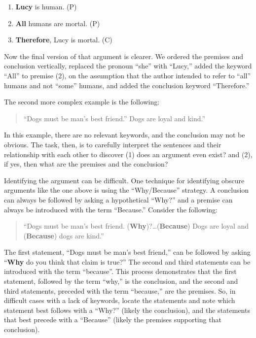 \documentclass[
]{book}
\providecommand{\tightlist}{%
  \setlength{\itemsep}{0pt}\setlength{\parskip}{0pt}}
\begin{document}
\begin{enumerate}
\def\labelenumi{\arabic{enumi}.}
\tightlist
\item
  \textbf{Lucy} is human. (P)\\
\item
  \textbf{All} humans are mortal. (P)\\
\item
  \textbf{Therefore}, Lucy is mortal. (C)
\end{enumerate}

Now the final version of that argument is clearer. We ordered the premises and conclusion vertically, replaced the pronoun ``she'' with ``Lucy,'' added the keyword ``All'' to premise (2), on the assumption that the author intended to refer to ``all'' humans and not ``some'' humans, and added the conclusion keyword ``Therefore.''

The second more complex example is the following:

\begin{quote}
``Dogs must be man's best friend.'' Dogs are loyal and kind.''
\end{quote}

In this example, there are no relevant keywords, and the conclusion may not be obvious. The task, then, is to carefully interpret the sentences and their relationship with each other to discover (1) does an argument even exist? and (2), if yes, then what are the premises and the conclusion?

Identifying the argument can be difficult. One technique for identifying obscure arguments like the one above is using the ``Why/Because'' strategy. A conclusion can always be followed by asking a hypothetical ``Why?'' and a premise can always be introduced with the term ``Because.'' Consider the following:

\begin{quote}
``Dogs must be man's best friend. (\textbf{Why})?\ldots(\textbf{Because}) Dogs are loyal and (\textbf{Because}) dogs are kind.''
\end{quote}

The first statement, ``Dogs must be man's best friend,'' can be followed by asking ``\textbf{Why} do you think that claim is true?'' The second and third statements can be introduced with the term ``because''. This process demonstrates that the first statement, followed by the term ``why,'' is the conclusion, and the second and third statements, preceded with the term ``because,'' are the premises. So, in difficult cases with a lack of keywords, locate the statements and note which statement best follows with a ``Why?'' (likely the conclusion), and the statements that best precede with a ``Because'' (likely the premises supporting that conclusion).
\end{document}

